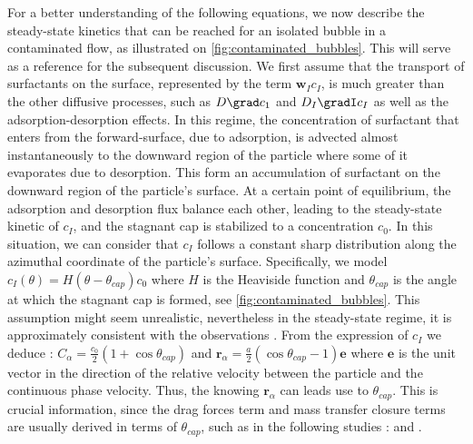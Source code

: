 For a better understanding of the following equations, we now describe the steady-state kinetics that can be reached for an isolated bubble in a contaminated flow, as illustrated on \ref{fig:contaminated_bubbles}.
This will serve as a reference for the subsequent discussion.
We first assume that the transport of surfactants on the surface, represented  by the term  $\textbf{w}_I c_I$, is much greater than the other diffusive processes, such as $D\grad c_1$ and $D_I\gradI c_I$ as well as the adsorption-desorption effects. 
In this regime, the concentration of surfactant that enters from the forward-surface, due to adsorption, is advected almost instantaneously to the downward region of the particle where some of it evaporates due to desorption. 
This form an accumulation of surfactant on the downward region of the particle's surface.
At a certain point of equilibrium, the adsorption and desorption flux balance each other, leading to the steady-state kinetic of $c_I$, and the stagnant cap is stabilized to a concentration $c_0$. 
In this situation, we can consider that $c_I$ follows a constant sharp distribution along the azimuthal coordinate of the particle's surface.
Specifically, we model $c_I(\theta) = H(\theta - \theta_{cap}) c_0$ where $H$ is the Heaviside function and $\theta_{cap}$ is the angle at which the stagnant cap is formed, see \ref{fig:contaminated_bubbles}.
This assumption might seem unrealistic, nevertheless in the steady-state regime, it is approximately consistent with the observations \citep{kentheswaran2022direct}.
From the expression of $c_I$ we deduce : $C_\alpha = \frac{c_0}{2}(1+\cos\theta_{cap})$ and $\textbf{r}_\alpha = \frac{a}{2} (\cos\theta_{cap} -1)\textbf{e}$ where $\textbf{e}$ is the unit vector in the direction of the relative velocity between the particle and the continuous phase velocity.
Thus, the knowing $\textbf{r}_\alpha$ can leads use to $\theta_{cap}$. 
This is crucial information, since the drag forces term and mass transfer closure terms are usually derived in terms of $\theta_{cap}$, such as in the following studies : \citet{sadhal1983stokes} and \citet{kentheswaran2022direct}. 

